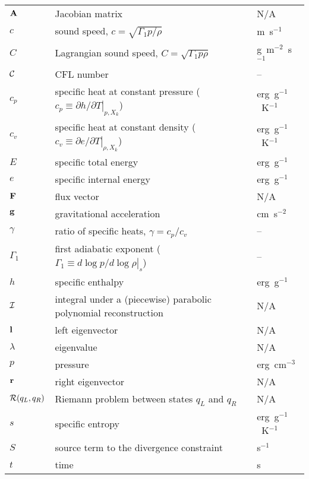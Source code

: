 \begin{center}
\begin{longtable}{|l|p{4.0in}|l|}
\hline 
\endlastfoot
${\bf A}$     & Jacobian matrix  & N/A \\
%
$c$     & sound speed, $c = \sqrt{\Gamma_1 p/\rho}$  & m~s$^{-1}$ \\
%
$C$       & Lagrangian sound speed, $C = \sqrt{\Gamma_1 p \rho}$ & g~m$^{-2}$~s$^{-1}$\\
%
${\mathcal{C}}$    & CFL number & --\\
%
$c_p$   & specific heat at constant pressure
          ($c_p \equiv \left . \partial h / \partial T \right |_{p,X_k}$)
        & erg~g$^{-1}$~K$^{-1}$ \\
%
$c_v$   & specific heat at constant density
          ($c_v \equiv \left . \partial e / \partial T \right |_{\rho,X_k}$)
        & erg~g$^{-1}$~K$^{-1}$ \\
%
$E$     & specific total energy                      & erg~g$^{-1}$ \\
%
$e$     & specific internal energy                   & erg~g$^{-1}$ \\
%
${\bf F}$     & flux vector                                & N/A \\
%
${\bf g}$     & gravitational acceleration                 & cm~s$^{-2}$ \\
%
$\gamma$ & ratio of specific heats, $\gamma = c_p/c_v$ & -- \\
%
$\Gamma_1$ & first adiabatic exponent ($\Gamma_1 \equiv \left . d \log p/d \log \rho \right |_s$) & -- \\
%
$h$     & specific enthalpy                          & erg~g$^{-1}$ \\
%
${\mathcal{I}}$   & integral under a (piecewise) parabolic polynomial reconstruction & N/A \\
%
${\bf l}$     & left eigenvector                           & N/A \\
%
$\lambda$ & eigenvalue                               & N/A \\
% 
$p$     & pressure                                   & erg~cm$^{-3}$ \\
%
${\bf r}$     & right eigenvector                          & N/A \\
%
${\mathcal{R}}(q_L, q_R)$ & Riemann problem between states $q_L$ and $q_R$ & N/A \\
%
$s$     & specific entropy                           & erg~g$^{-1}$~K$^{-1}$ \\
%
$S$     & source term to the divergence constraint   & s$^{-1}$ \\
%
$t$     & time                                       & s \\

\end{longtable}
\end{center}

